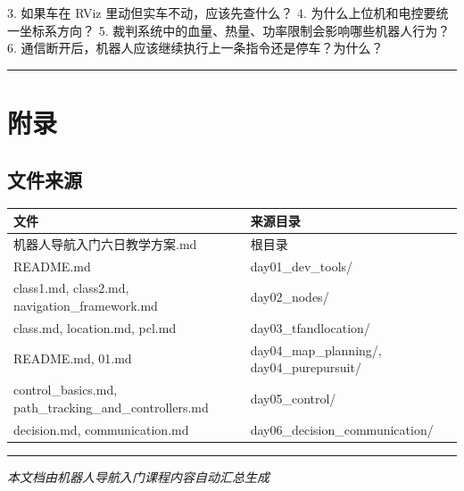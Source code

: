 \documentclass[a4paper,12pt]{book}
\begin{document}
3. 如果车在 RViz 里动但实车不动，应该先查什么？
4. 为什么上位机和电控要统一坐标系方向？
5. 裁判系统中的血量、热量、功率限制会影响哪些机器人行为？
6. 通信断开后，机器人应该继续执行上一条指令还是停车？为什么？

\noindent\rule{\textwidth}{1pt}

\chapter{附录}

\section{文件来源}

\begin{table}[h]
\centering
\small
\begin{tabular}{|l|l|}
\hline
文件 & 来源目录 \\
\hline
机器人导航入门六日教学方案.md & 根目录 \\
\hline
README.md & day01\_dev\_tools/ \\
\hline
class1.md, class2.md, navigation\_framework.md & day02\_nodes/ \\
\hline
class.md, location.md, pcl.md & day03\_tfandlocation/ \\
\hline
README.md, 01.md & day04\_map\_planning/, day04\_purepursuit/ \\
\hline
control\_basics.md, path\_tracking\_and\_controllers.md & day05\_control/ \\
\hline
decision.md, communication.md & day06\_decision\_communication/ \\
\hline
\end{tabular}
\end{table}
\noindent\rule{\textwidth}{1pt}

\textit{本文档由机器人导航入门课程内容自动汇总生成}
\end{document}
